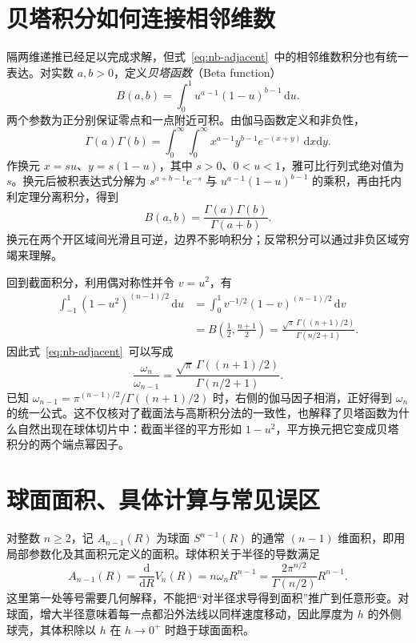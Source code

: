 \documentclass[UTF8,12pt,a4paper,fontset=fandol]{ctexart}
\begin{document}
\section{贝塔积分如何连接相邻维数}
\label{sec:nb-beta}

隔两维递推已经足以完成求解，但式~\eqref{eq:nb-adjacent}~中的相邻维数积分也有统一表达。对实数 $a,b>0$，定义\emph{贝塔函数}（Beta function）
\[
  B(a,b)=\int_0^1u^{a-1}(1-u)^{b-1}\,\mathrm du.
\]
两个参数为正分别保证零点和一点附近可积。由伽马函数定义和非负性，
\[
  \Gamma(a)\Gamma(b)=\int_0^\infty\int_0^\infty
  x^{a-1}y^{b-1}e^{-(x+y)}\,\mathrm dx\mathrm dy.
\]
作换元 $x=su$、$y=s(1-u)$，其中 $s>0$、$0<u<1$，雅可比行列式绝对值为 $s$。换元后被积表达式分解为 $s^{a+b-1}e^{-s}$ 与 $u^{a-1}(1-u)^{b-1}$ 的乘积，再由托内利定理分离积分，得到
\begin{equation}\label{eq:nb-beta-gamma}
  B(a,b)=\frac{\Gamma(a)\Gamma(b)}{\Gamma(a+b)}.
\end{equation}
换元在两个开区域间光滑且可逆，边界不影响积分；反常积分可以通过非负区域穷竭来理解。

回到截面积分，利用偶对称性并令 $v=u^2$，有
\begin{align*}
  \int_{-1}^1(1-u^2)^{(n-1)/2}\,\mathrm du
  &=\int_0^1v^{-1/2}(1-v)^{(n-1)/2}\,\mathrm dv\\
  &=B\!\left(\frac12,\frac{n+1}{2}\right)
   =\frac{\sqrt\pi\,\Gamma((n+1)/2)}{\Gamma(n/2+1)}.
\end{align*}
因此式~\eqref{eq:nb-adjacent}~可以写成
\[
  \frac{\omega_n}{\omega_{n-1}}
  =\frac{\sqrt\pi\,\Gamma((n+1)/2)}{\Gamma(n/2+1)}.
\]
已知 $\omega_{n-1}=\pi^{(n-1)/2}/\Gamma((n+1)/2)$ 时，右侧的伽马因子相消，正好得到 $\omega_n$ 的统一公式。这不仅核对了截面法与高斯积分法的一致性，也解释了贝塔函数为什么自然出现在球体切片中：截面半径的平方形如 $1-u^2$，平方换元把它变成贝塔积分的两个端点幂因子。

\section{球面面积、具体计算与常见误区}
\label{sec:nb-surface}

对整数 $n\geq2$，记 $A_{n-1}(R)$ 为球面 $S^{n-1}(R)$ 的通常 $(n-1)$ 维面积，即用局部参数化及其面积元定义的面积。球体积关于半径的导数满足
\begin{equation}\label{eq:nb-area}
  A_{n-1}(R)=\frac{\mathrm d}{\mathrm dR}V_n(R)
  =n\omega_nR^{n-1}
  =\frac{2\pi^{n/2}}{\Gamma(n/2)}R^{n-1}.
\end{equation}
这里第一处等号需要几何解释，不能把“对半径求导得到面积”推广到任意形变。对球面，增大半径意味着每一点都沿外法线以同样速度移动，因此厚度为 $h$ 的外侧球壳，其体积除以 $h$ 在 $h\to0^+$ 时趋于球面面积。
\end{document}
